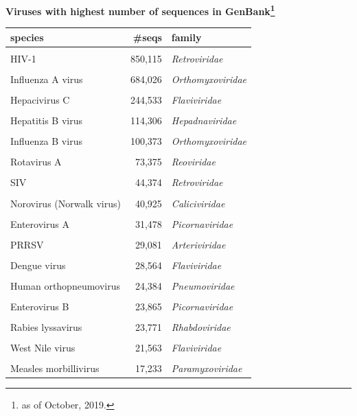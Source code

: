 \documentclass[landscape]{slides}
\begin{document}
\begin{slide}
\begin{center}

\textbf{Viruses with highest number of sequences in GenBank\footnote{as of October, 2019.}}

\tiny
\begin{tabular}{lrl}
species                   &       \#seqs & family           \\ \hline
& & \\
HIV-1                     &      850,115 & \emph{Retroviridae}     \\ %
& & \\
Influenza A virus         &      684,026 & \emph{Orthomyxoviridae} \\ %
& & \\
Hepacivirus C             &      244,533 & \emph{Flaviviridae}     \\ %
& & \\
Hepatitis B virus         &      114,306 & \emph{Hepadnaviridae}   \\ %
& & \\
Influenza B virus         &      100,373 & \emph{Orthomyxoviridae} \\ %
& & \\
Rotavirus A               &       73,375 & \emph{Reoviridae}       \\ %
& & \\
SIV                       &       44,374 & \emph{Retroviridae}     \\ %
& & \\
Norovirus (Norwalk virus) &       40,925 & \emph{Caliciviridae}    \\ %
& & \\
Enterovirus A             &       31,478 & \emph{Picornaviridae}   \\ %
& & \\
PRRSV                     &       29,081 & \emph{Arteriviridae}    \\ %
& & \\
Dengue virus              &       28,564 & \emph{Flaviviridae}     \\ %
& & \\
Human orthopneumovirus    &       24,384 & \emph{Pneumoviridae}    \\ %
& & \\
Enterovirus B             &       23,865 & \emph{Picornaviridae}   \\ %
& & \\
Rabies lyssavirus         &       23,771 & \emph{Rhabdoviridae}    \\ %
& & \\
West Nile virus           &       21,563 & \emph{Flaviviridae}     \\ %
& & \\
Measles morbillivirus     &       17,233 & \emph{Paramyxoviridae}  \\ %
\end{tabular}


\end{center}
\end{slide}
\end{document}
